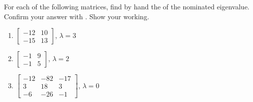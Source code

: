 \begin{exercise}  
For each of the following matrices, find by hand the  of the nominated eigenvalue.  
Confirm your answer with \script.  
Show your working.  
\begin{enumerate}
\item \(\begin{bmatrix} -12 & 10
\\-15 & 13 \end{bmatrix}\), \(\lambda=3\)

\item \(\begin{bmatrix} -1 & 9
\\-1 & 5 \end{bmatrix}\), \(\lambda=2\)


\item \(\begin{bmatrix} -12 & -82 & -17
\\3 & 18 & 3
\\-6 & -26 & -1 \end{bmatrix}\), \(\lambda=0\)


\end{enumerate}
\end{exercise}
